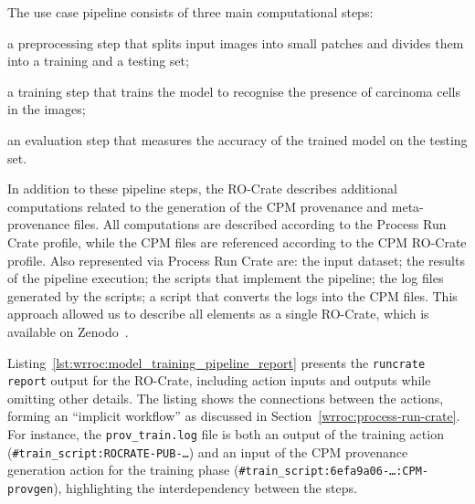 The use case pipeline consists of three main computational steps:
\begin{inlineenum}
\item a preprocessing step that splits input images into small patches and divides them into a training and a testing set;
\item a training step that trains the model to recognise the presence of carcinoma cells in the images;
\item an evaluation step that measures the accuracy of the trained model on the testing set.
\end{inlineenum}
In addition to these pipeline steps, the RO-Crate describes additional computations related to the generation of the CPM provenance and meta-provenance files.
All computations are described according to the Process Run Crate profile, while the CPM files are referenced according to the CPM RO-Crate profile. 
Also represented via Process Run Crate are: the input dataset; the results of the pipeline execution; the scripts that implement the pipeline; the log files generated by the scripts; a script that converts the logs into the CPM files.
This approach allowed us to describe all elements as a single RO-Crate, which
is available on Zenodo~\cite{Wittner 2023a}.

Listing~\ref{lst:wrroc:model_training_pipeline_report} presents the \texttt{runcrate report} output for the RO-Crate,
including action inputs and outputs while omitting other details. The listing shows the connections between the actions, forming an ``implicit workflow'' as discussed in Section~\ref{wrroc:process-run-crate}. For instance, the \texttt{prov\_train.log} file is both an output of the training action (\texttt{\#train\_script:ROCRATE-PUB-\ldots}) and an input of the CPM provenance generation action for the training phase (\texttt{\#train\_script:6efa9a06-\ldots:CPM-provgen}), highlighting the interdependency between the steps.


